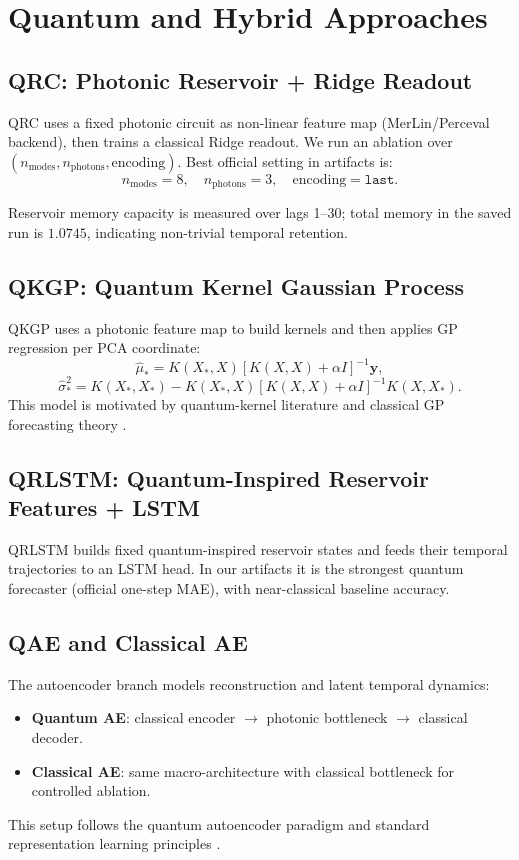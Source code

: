 \documentclass[11pt]{article}
\begin{document}
\section{Quantum and Hybrid Approaches}
\subsection{QRC: Photonic Reservoir + Ridge Readout}
QRC uses a fixed photonic circuit as non-linear feature map (MerLin/Perceval backend), then trains a classical Ridge readout. We run an ablation over \((n_{\text{modes}}, n_{\text{photons}}, \text{encoding})\). Best official setting in artifacts is:
\[
n_{\text{modes}}=8,\quad n_{\text{photons}}=3,\quad \text{encoding}=\texttt{last}.
\]

Reservoir memory capacity is measured over lags 1--30; total memory in the saved run is \(1.0745\), indicating non-trivial temporal retention.

\subsection{QKGP: Quantum Kernel Gaussian Process}
QKGP uses a photonic feature map to build kernels and then applies GP regression per PCA coordinate:
\begin{equation}
\hat{\mu}_* = K(X_*,X)\left[K(X,X)+\alpha I\right]^{-1}\mathbf{y},
\end{equation}
\begin{equation}
\hat{\sigma}^2_* = K(X_*,X_*) - K(X_*,X)\left[K(X,X)+\alpha I\right]^{-1}K(X,X_*).
\end{equation}
This model is motivated by quantum-kernel literature \cite{havlicek2019supervised,schuld2019feature,schuld2021kernel} and classical GP forecasting theory \cite{rasmussen2006gp}.

\subsection{QRLSTM: Quantum-Inspired Reservoir Features + LSTM}
QRLSTM builds fixed quantum-inspired reservoir states and feeds their temporal trajectories to an LSTM head. In our artifacts it is the strongest quantum forecaster (official one-step MAE), with near-classical baseline accuracy.

\subsection{QAE and Classical AE}
The autoencoder branch models reconstruction and latent temporal dynamics:
\begin{itemize}[leftmargin=1.4em]
  \item \textbf{Quantum AE}: classical encoder \(\rightarrow\) photonic bottleneck \(\rightarrow\) classical decoder.
  \item \textbf{Classical AE}: same macro-architecture with classical bottleneck for controlled ablation.
\end{itemize}
This setup follows the quantum autoencoder paradigm \cite{romero2017qae} and standard representation learning principles \cite{hinton2006reducing}.
\end{document}
